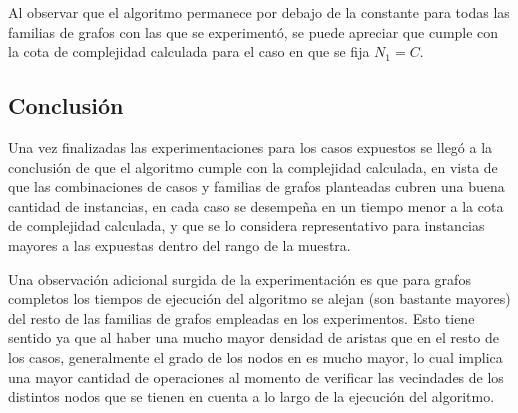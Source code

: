 Al observar que el algoritmo permanece por debajo de la constante para todas
las familias de grafos con las que se experimentó, se puede apreciar que
cumple con la cota de complejidad calculada para el caso en que se fija
$N_1 = C$.

\subsection{Conclusión}

Una vez finalizadas las experimentaciones para los casos expuestos se llegó a
la conclusión de que el algoritmo cumple con la complejidad calculada, en
vista de que las combinaciones de casos y familias de grafos planteadas cubren
una buena cantidad de instancias, en cada caso se desempeña en un tiempo menor
a la cota de complejidad calculada, y que se lo considera representativo para
instancias mayores a las expuestas dentro del rango de la muestra.

Una observación adicional surgida de la experimentación es que para grafos
completos los tiempos de ejecución del algoritmo se alejan (son bastante
mayores) del resto de las familias de grafos empleadas en los experimentos.
Esto tiene sentido ya que al haber una mucho mayor densidad de aristas que en
el resto de los casos, generalmente el grado de los nodos en es mucho mayor,
lo cual implica una mayor cantidad de operaciones al momento de verificar
las vecindades de los distintos nodos que se tienen en cuenta a lo largo de la
ejecución del algoritmo.